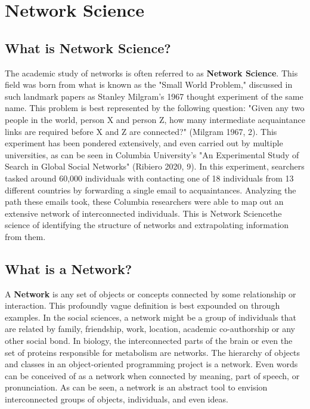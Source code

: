 \documentclass{article}
\begin{document}
\section{Network Science}

\subsection{What is Network Science?}
The academic study of networks is often referred to as \textbf{Network Science}. This field was born from what is known as the "Small World Problem,"
discussed in such landmark papers as Stanley Milgram's 1967 thought experiment of the same name. This problem is best represented by the following question:
"Given any two people in the world, person X and person Z, how many intermediate acquaintance links are required before X and Z are connected?" (Milgram 1967, 2). This experiment has been
pondered extensively, and even carried out by multiple universities, as can be seen in Columbia University's "An Experimental Study of Search in Global Social Networks" (Ribiero 2020, 9). In this experiment,
searchers tasked around 60,000 individuals with contacting one of 18 individuals from 13 different countries by forwarding a single email to acquaintances. Analyzing the path these emails took,
these Columbia researchers were able to map out an extensive network of interconnected individuals. This is Network Science\textemdash the science of identifying the structure of networks and extrapolating information
from them.

\subsection{What is a Network?}
A \textbf{Network} is any set of objects or concepts connected by some relationship or interaction. 
This profoundly vague definition is best expounded on through examples. In the social sciences, a network might be a group of individuals that are related by family, friendship, work, location, academic co-authorship or any other social bond. 
In biology, the interconnected parts of the brain or even the set of proteins responsible for metabolism are networks. 
The hierarchy of objects and classes in an object-oriented programming project is a network. 
Even words can be conceived of as a network when connected by meaning, part of speech, or pronunciation. As can be seen, a network is an abstract tool to envision 
interconnected groups of objects, individuals, and even ideas.   
\end{document}
